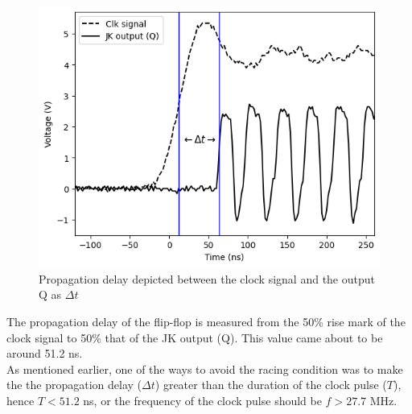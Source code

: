\begin{figure}[H]
    \centering
    \includegraphics[width=1\columnwidth]{images/propagation.png}
    \caption{Propagation delay depicted between the clock signal and the output Q as $\Delta t$}
\end{figure}

The propagation delay of the flip-flop is measured from the 50\% rise mark of the clock signal to 50\% that of the JK output (Q). This value came about to be around 51.2 ns.\\

As mentioned earlier, one of the ways to avoid the racing condition was to make the the propagation delay ($\Delta t$) greater than the duration of the clock pulse ($T$), hence $T < 51.2$ ns, or the frequency of the clock pulse should be $f > 27.7$ MHz.\\
